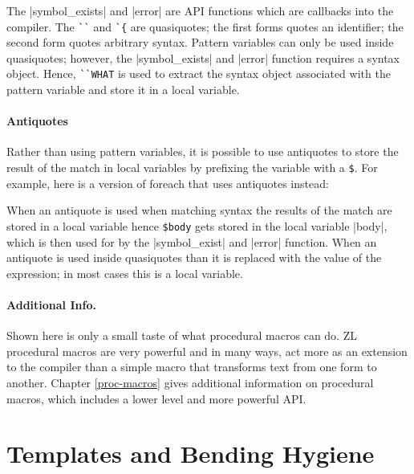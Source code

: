 The |symbol_exists| and |error| are API functions which are callbacks
into the compiler.  The \verb/``/ and \verb/`{/ are quasiquotes; the
first forms quotes an identifier; the second form quotes arbitrary
syntax.  Pattern variables can only be used inside quasiquotes;
however, the |symbol_exists| and |error| function requires a syntax
object.  Hence, \verb/``WHAT/ is used to extract the syntax object
associated with the pattern variable and store it in a local variable.

\paragraph{Antiquotes}

Rather than using pattern variables, it is possible to use antiquotes
to store the result of the match in local variables by prefixing the
variable with a \verb/$/.  For example, here is a version of foreach
that uses antiquotes instead:

When an antiquote is used when matching syntax the results of the
match are stored in a local variable hence \verb/$body/ gets stored in
the local variable |body|, which is then used for by the
|symbol_exist| and |error| function.  When an antiquote is used inside
quasiquotes than it is replaced with the value of the expression; in
most cases this is a local variable.

\paragraph{Additional Info.}

Shown here is only a small taste of what procedural macros can do.  ZL
procedural macros are very powerful and in many ways, act more as
an extension to the compiler than a simple macro that transforms text
from one form to another.  Chapter \ref{proc-macros} gives additional
information on procedural macros, which includes a lower level and
more powerful API.

\section{Templates and Bending Hygiene}
\label{mk_vector}

